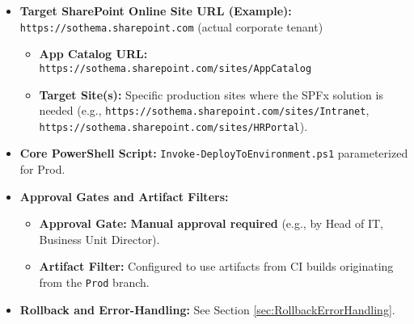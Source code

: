 \begin{itemize}
    \item \textbf{Target SharePoint Online Site URL (Example):} \texttt{https://sothema.sharepoint.com} (actual corporate tenant)
    \begin{itemize}
        \item \textbf{App Catalog URL:} \texttt{https://sothema.sharepoint.com/sites/AppCatalog}
        \item \textbf{Target Site(s):} Specific production sites where the SPFx solution is needed (e.g., \texttt{https://sothema.sharepoint.com/sites/Intranet}, \texttt{https://sothema.sharepoint.com/sites/HRPortal}).
    \end{itemize}
    \item \textbf{Core PowerShell Script:} \texttt{Invoke-DeployToEnvironment.ps1} parameterized for Prod.
    \item \textbf{Approval Gates and Artifact Filters:}
    \begin{itemize}
        \item \textbf{Approval Gate:} \textbf{Manual approval required} (e.g., by Head of IT, Business Unit Director).
        \item \textbf{Artifact Filter:} Configured to use artifacts from CI builds originating from the \texttt{Prod} branch.
    \end{itemize}
    \item \textbf{Rollback and Error-Handling:} See Section \ref{sec:RollbackErrorHandling}.
\end{itemize}

